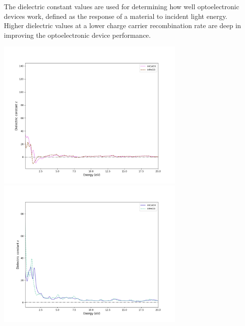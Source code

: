 \documentclass[12pt, letterpaper]{article}
\newcommand*{\1}{\hspace{1pt}}
\begin{document}
    The dielectric constant values are used for determining how well optoelectronic devices work, defined as the response of a material to incident light energy. Higher dielectric values at a lower 
    charge carrier recombination rate are deep in improving the optoelectronic device performance. 

    \begin{adjustbox}{center, caption={Dielectric constants of InCoO3 and InFeO3},label={somelabel},nofloat=figure,}
        \includegraphics[width=0.7\textwidth]{dieleceng}
        \includegraphics[width=0.7\textwidth]{dielecimageng}
    \end{adjustbox}
\end{document}
